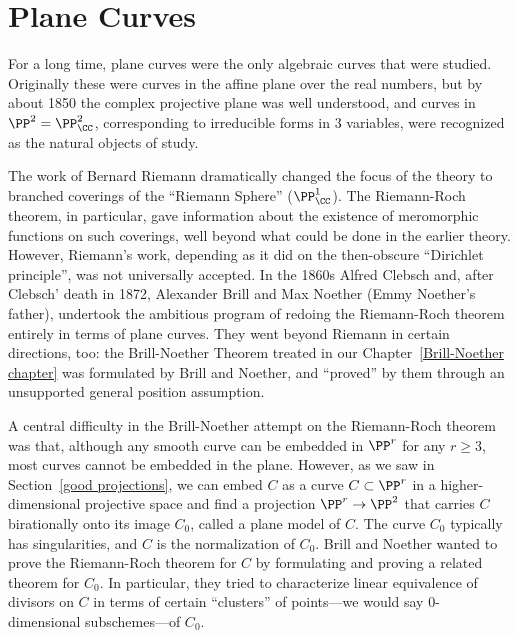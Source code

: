 

\chapter{Plane Curves}
\label{PlaneCurvesChapter}


For a long time, plane curves were the only algebraic curves that were studied. Originally these were curves in the affine plane over the real numbers, but by about 1850 the complex projective plane was well understood, and curves in $\PP^2 = \PP^2_\CC$, corresponding to irreducible forms in 3 variables, were recognized as the natural objects of study. 

The work of Bernard Riemann dramatically changed the focus of the theory to branched coverings of   the ``Riemann Sphere'' ($\PP^1_\CC$). The Riemann-Roch theorem, in particular, gave information about the existence of meromorphic functions on such coverings, well beyond what could be done in the earlier theory. However, Riemann's work, depending as it did on the then-obscure ``Dirichlet principle'', was not universally accepted. In the 1860s Alfred Clebsch and, after Clebsch' death in 1872, Alexander Brill and Max Noether (Emmy Noether's father), undertook the ambitious program of redoing the Riemann-Roch theorem entirely in terms of plane curves. They went beyond Riemann in certain directions, too: the Brill-Noether Theorem treated in our Chapter~\ref{Brill-Noether chapter} was formulated by Brill and Noether, and ``proved'' by them through an unsupported general position assumption. 

A central difficulty in the Brill-Noether attempt on the Riemann-Roch theorem was that,
although any smooth curve can be embedded in $\PP^r$ for any $r \geq 3$, most curves cannot be embedded in the plane. 
However, as we saw in Section~\ref{good projections}, we can embed $C$ as a curve $ C \subset \PP^r$ in a higher-dimensional projective space and find a projection $\PP^r \to \PP^2$ that carries $C$ birationally onto its image $C_0$, called a plane model of $C$. The curve $C_0$ typically has singularities, and $C$ is the normalization of $C_0$. Brill and Noether wanted to prove the Riemann-Roch theorem for $C$ by formulating and proving a related theorem for $C_0$. In particular, they tried to characterize linear equivalence of divisors on $C$ in terms of certain ``clusters'' of points---we would say 0-dimensional subschemes---of $C_0$. 

